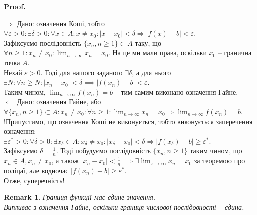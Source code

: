 \documentclass[a4paper, 14pt]{article}
\makeatletter
\def\qed{$\blacksquare$}
\def\rightproof{$\boxed{\Rightarrow}$ }
\def\leftproof{$\boxed{\Leftarrow}$ }
\theoremstyle{theoremdd}
\theoremstyle{theoremdd}
\theoremstyle{theoremdd}
\theoremstyle{theoremdd}
\theoremstyle{theoremdd}
\theoremstyle{theoremdd}
\newtheorem{remark}[theorem]{Remark}
\theoremstyle{theoremdd}
\theoremstyle{theoremdd}
\renewenvironment{proof}[1][Proof.\\]{\par
\pushQED{\hfill \qed}%
\normalfont \topsep6\p@\@plus6\p@\relax
\trivlist
\item\relax
{\bfseries
#1\@addpunct{.}}\hspace\labelsep\ignorespaces
}{%
\popQED\endtrivlist\@endpefalse
}
\makeatother
\begin{document}
	\begin{proof}
	\rightproof Дано: означення Коші, тобто $\forall \varepsilon > 0: \exists \delta > 0: \forall x \in A: x \neq x_0: |x-x_0|<\delta \Rightarrow |f(x)-b|<\varepsilon$.\\
	Зафіксуємо послідовність $\{x_n, n \geq 1\} \subset A$ таку, що $\forall n \geq 1: x_n \neq x_0: \displaystyle \lim_{n \to \infty} x_n = x_0$. На це ми мали права, оскільки $x_0$ -- гранична точка $A$.\\
	Нехай $\varepsilon > 0$. Тоді для нашого заданого $\exists \delta$, а для нього $\exists N: \forall n \geq N: |x_n - x_0| < \delta \implies |f(x_n) - b| < \varepsilon$.\\
	Таким чином, $\displaystyle \lim_{n \to \infty} f(x_n) = b$ -- тим самим виконано означення Гайне.
	\bigskip \\
	\leftproof Дано: означення Гайне, або $\displaystyle \forall \{x_n, n \geq 1\}\subset A: x_n \neq x_0: \forall n \geq 1: \lim_{n \to \infty} x_n = x_0 \Rightarrow \lim_{n \to \infty} f(x_n) = b$.\\
	!Припустимо, що означення Коші не виконується, тобто виконується заперечення означення:\\
	$\exists \varepsilon^*>0: \forall \delta > 0: \exists x_{\delta} \in A: x_{\delta} \neq x_{0}: |x_{\delta} - x_0| < \delta \Rightarrow |f(x_{\delta}) - b| \geq \varepsilon^*$.\\
	Зафіксуємо $\delta = \displaystyle \frac{1}{n}$. Тоді побудуємо послідовність $\{x_n, n \geq 1\}$ таким чином, що $x_n \in A, x_n \neq x_0$, а також $|x_n-x_0| < \displaystyle \frac{1}{n} \implies \exists \lim_{x \to \infty} x_n = x_0$ за теоремою про поліцаї, але водночас $|f(x_n) - b| \geq \varepsilon^*$.\\
	Отже, суперечність!
	\end{proof}
	
	\begin{remark}
	Границя функції має єдине значення.\\
	\textit{Випливає з означення Гайне, оскільки границя числової послідовності -- єдина.}
	\end{remark}
	
\end{document}
